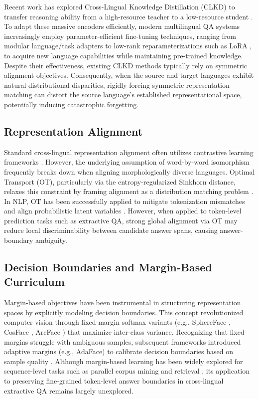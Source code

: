 \documentclass[11pt]{article}
\begin{document}
Recent work has explored Cross-Lingual Knowledge Distillation (CLKD) to transfer reasoning ability from a high-resource teacher to a low-resource student \cite{gupta-etal-2023-cross}. To adapt these massive encoders efficiently, modern multilingual QA systems increasingly employ parameter-efficient fine-tuning techniques, ranging from modular language/task adapters \cite{pfeiffer-etal-2020-mad} to low-rank reparameterizations such as LoRA \cite{hu2021loralowrankadaptationlarge}, to acquire new language capabilities while maintaining pre-trained knowledge. Despite their effectiveness, existing CLKD methods typically rely on symmetric alignment objectives. Consequently, when the source and target languages exhibit natural distributional disparities, rigidly forcing symmetric representation matching can distort the source language's established representational space, potentially inducing catastrophic forgetting.

\subsection{Representation Alignment}
Standard cross-lingual representation alignment often utilizes contrastive learning frameworks \cite{chi-etal-2021-infoxlm}. However, the underlying assumption of word-by-word isomorphism frequently breaks down when aligning morphologically diverse languages. Optimal Transport (OT), particularly via the entropy-regularized Sinkhorn distance, relaxes this constraint by framing alignment as a distribution matching problem \cite{cuturi2013sinkhorndistanceslightspeedcomputation}. In NLP, OT has been successfully applied to mitigate tokenization mismatches and align probabilistic latent variables \cite{sherborne-etal-2023-optimal}. However, when applied to token-level prediction tasks such as extractive QA, strong global alignment via OT may reduce local discriminability between candidate answer spans, causing answer-boundary ambiguity.

\subsection{Decision Boundaries and Margin-Based Curriculum}
Margin-based objectives have been instrumental in structuring representation spaces by explicitly modeling decision boundaries. This concept revolutionized computer vision through fixed-margin softmax variants (e.g., SphereFace \cite{liu2018spherefacedeephypersphereembedding}, CosFace \cite{wang2018cosfacelargemargincosine}, ArcFace \cite{Deng_2022}) that maximize inter-class variance. Recognizing that fixed margins struggle with ambiguous samples, subsequent frameworks introduced adaptive margins (e.g., AdaFace) to calibrate decision boundaries based on sample quality \cite{kim2023adafacequalityadaptivemargin}. Although margin-based learning has been widely explored for sequence-level tasks such as parallel corpus mining and retrieval \cite{artetxe-schwenk-2019-margin}, its application to preserving fine-grained token-level answer boundaries in cross-lingual extractive QA remains largely unexplored.
\end{document}

